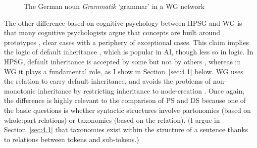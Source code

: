 \documentclass[output=paper,biblatex,babelshorthands,newtxmath,draftmode,colorlinks,citecolor=brown]{langscibook}
\begin{document}
\begin{figure}
	\centering
{}
	\caption{The German noun \emph{Grammatik} `grammar' in a WG network}
	\label{fig:7}
\end{figure}

The other difference based on cognitive psychology between HPSG and WG is that many cognitive psychologists argue that concepts are built around prototypes \citep{Rosch1973,Taylor1995}, clear cases with a periphery of exceptional cases. This claim implies the logic of default inheritance \citep{BCdP93a-ed}, which is popular in AI, though less so in logic. In HPSG, default inheritance is accepted by some \citep{LC99a} but not by others \citep[403]{MuellerGT-Eng2}, whereas in WG it plays a fundamental role, as I show in Section~\ref{sec:4.1} below. WG uses the  relation to carry default inheritance, and avoids the problems of non-monotonic inheritance by restricting inheritance to node-creation \citep[18]{Hudson2018a}. Once again, the difference is highly relevant to the comparison of PS and DS because one of the basic questions is whether syntactic structures involve partonomies (based on whole:part relations) or taxonomies (based on the  relation). (I argue in Section~\ref{sec:4.1} that taxonomies exist within the structure of a sentence thanks to  relations between tokens and sub-tokens.)
\end{document}
